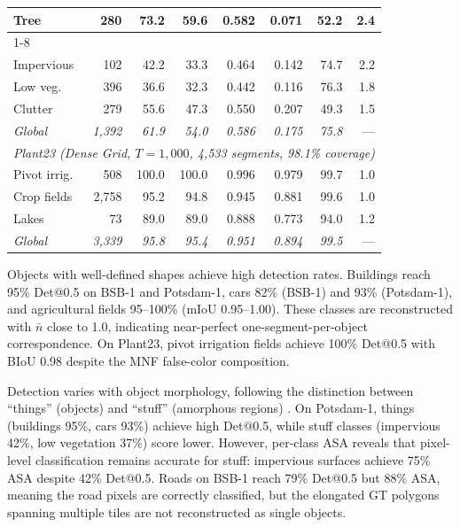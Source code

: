 \documentclass[review,11pt,authoryear]{elsarticle}
\begin{document}
\begin{table}[htbp]
\begin{tabular}{lrrrrrrr}
Tree        &     280 & 73.2 & 59.6 & 0.582 & 0.071 & 52.2 & 2.4 \\
\cmidrule{1-8}
\multicolumn{8}{l}{\scriptsize\textit{Stuff}} \\
Impervious  &     102 & 42.2 & 33.3 & 0.464 & 0.142 & 74.7 & 2.2 \\
Low veg.    &     396 & 36.6 & 32.3 & 0.442 & 0.116 & 76.3 & 1.8 \\
Clutter     &     279 & 55.6 & 47.3 & 0.550 & 0.207 & 49.3 & 1.5 \\
\textit{Global} & \textit{1{,}392} & \textit{61.9} & \textit{54.0} & \textit{0.586} & \textit{0.175} & \textit{75.8} & --- \\
\midrule
\multicolumn{8}{c}{\footnotesize\textit{Plant23 (Dense Grid, $T = 1{,}000$, 4{,}533 segments, 98.1\% coverage)}} \\
\midrule
Pivot irrig. &    508 & 100.0 & 100.0 & 0.996 & 0.979 & 99.7 & 1.0 \\
Crop fields & 2{,}758 & 95.2 & 94.8 & 0.945 & 0.881 & 99.6 & 1.0 \\
Lakes       &      73 & 89.0 & 89.0 & 0.888 & 0.773 & 94.0 & 1.2 \\
\textit{Global} & \textit{3{,}339} & \textit{95.8} & \textit{95.4} & \textit{0.951} & \textit{0.894} & \textit{99.5} & --- \\
\bottomrule
\end{tabular}
\end{table}

Objects with well-defined shapes achieve high detection rates. Buildings reach 95\% Det@0.5 on BSB-1 and Potsdam-1, cars 82\% (BSB-1) and 93\% (Potsdam-1), and agricultural fields 95--100\% (mIoU 0.95--1.00). These classes are reconstructed with $\bar{n}$ close to 1.0, indicating near-perfect one-segment-per-object correspondence. On Plant23, pivot irrigation fields achieve 100\% Det@0.5 with BIoU 0.98 despite the MNF false-color composition.

Detection varies with object morphology, following the distinction between ``things'' (objects) and ``stuff'' (amorphous regions) \citep{kirillov2019panoptic}. On Potsdam-1, things (buildings 95\%, cars 93\%) achieve high Det@0.5, while stuff classes (impervious 42\%, low vegetation 37\%) score lower. However, per-class ASA reveals that pixel-level classification remains accurate for stuff: impervious surfaces achieve 75\% ASA despite 42\% Det@0.5. Roads on BSB-1 reach 79\% Det@0.5 but 88\% ASA, meaning the road pixels are correctly classified, but the elongated GT polygons spanning multiple tiles are not reconstructed as single objects.
\end{document}

